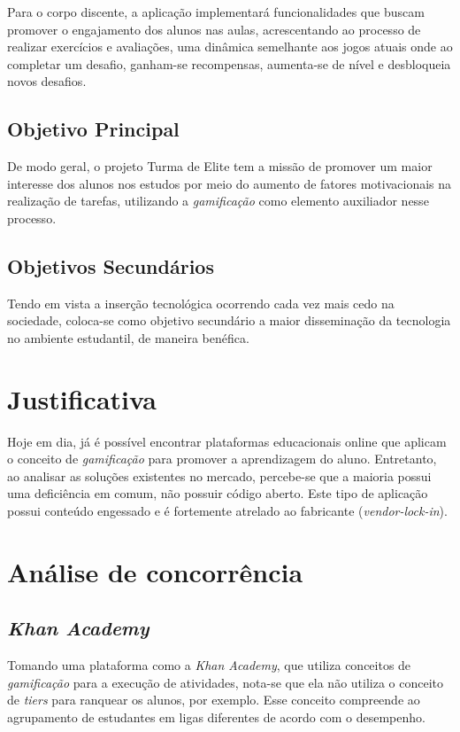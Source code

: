 \documentclass[
    12pt,               %
    openright,          %
    oneside,
    a4paper,            %
    paginasA3,  %
    english,            %
    brazil              %
    ]{ifsp-spo-inf-ctds} %
\begin{document}
Para o corpo discente, a aplicação implementará funcionalidades que buscam promover o engajamento dos alunos nas aulas, acrescentando ao processo de realizar exercícios e avaliações, uma dinâmica semelhante aos jogos atuais onde ao completar um desafio, ganham-se recompensas, aumenta-se de nível e desbloqueia novos desafios.

\subsection{Objetivo Principal}
De modo geral, o projeto Turma de Elite tem a missão de promover um maior interesse dos alunos nos estudos por meio do aumento de fatores motivacionais na realização de tarefas, utilizando a \textit{gamificação} como elemento auxiliador nesse processo.

\subsection{Objetivos Secundários}
Tendo em vista a inserção tecnológica ocorrendo cada vez mais cedo na sociedade, coloca-se como objetivo secundário a maior disseminação da tecnologia no ambiente estudantil, de maneira benéfica.

\section{Justificativa}
Hoje em dia, já é possível encontrar plataformas educacionais online que aplicam o conceito de \textit{gamificação} para promover a aprendizagem do aluno. Entretanto, ao analisar as soluções existentes no mercado, percebe-se que a maioria possui uma deficiência em comum, não possuir código aberto. Este tipo de aplicação possui conteúdo engessado e é fortemente atrelado ao fabricante (\textit{\gls{vendor-lock-in}}). 


\section{Análise de concorrência}
\subsection{\textit{Khan Academy}}
Tomando uma plataforma como a \textit{Khan Academy}, que utiliza conceitos de \textit{gamificação} para a execução de atividades, nota-se que ela não utiliza o conceito de \textit{\glspl{tier}} para ranquear os alunos, por exemplo. Esse conceito compreende ao agrupamento de estudantes em ligas diferentes de acordo com o desempenho.
\end{document}
